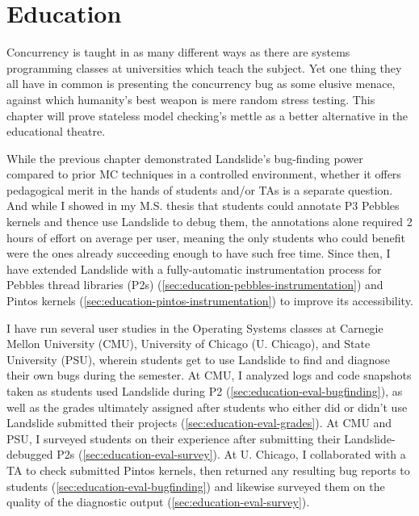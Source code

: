 \chapter{Education}
\label{chap:education}
\vspace{1em}


\vspace{3em}
Concurrency is taught in as many different ways as there are
systems programming classes at universities which teach the subject.
Yet one thing they all have in common is presenting the concurrency bug
as some elusive menace,
against which humanity's best weapon is mere random stress testing.
This chapter will prove stateless model checking's mettle as a better alternative in the educational theatre.

While the previous chapter demonstrated Landslide's bug-finding power
compared to prior MC techniques in a controlled environment,
whether it offers pedagogical merit in the hands of students and/or TAs is a separate question.
And while I showed in my M.S. thesis \cite{landslide} that students
could annotate P3 Pebbles kernels and thence use Landslide to debug them,
the annotations alone required 2 hours of effort on average per user,
meaning the only students who could benefit were the ones already succeeding enough to have such free time.
Since then, I have extended Landslide with a fully-automatic instrumentation process
for Pebbles thread libraries (P2s) (\cref{sec:education-pebbles-instrumentation})
and Pintos kernels (\cref{sec:education-pintos-instrumentation})
to improve its accessibility.

I have run several user studies in the Operating Systems classes
at Carnegie Mellon University (CMU), University of Chicago (U. Chicago),
and  State University (PSU),
wherein students get to use Landslide to find and diagnose their own bugs during the semester.
At CMU, I analyzed logs and code snapshots taken as students used Landslide during P2
(\cref{sec:education-eval-bugfinding}),
as well as the grades ultimately assigned after students who either did or didn't use Landslide submitted their projects
(\cref{sec:education-eval-grades}).
At CMU and PSU, I surveyed students on their experience after submitting their Landslide-debugged P2s
(\cref{sec:education-eval-survey}).
At U. Chicago, I collaborated with a TA to check submitted Pintos kernels,
then  returned any resulting bug reports to students
(\cref{sec:education-eval-bugfinding})
and likewise surveyed them on the quality of the diagnostic output
(\cref{sec:education-eval-survey}).


